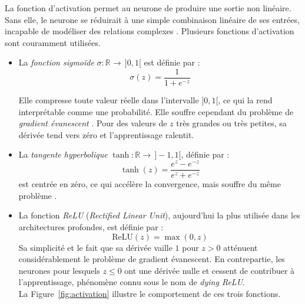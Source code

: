 \documentclass[a4paper,french]{style-LaTeX}
\begin{document}
La fonction d'activation permet au neurone de produire une sortie non linéaire. Sans elle, le neurone se réduirait à une simple combinaison linéaire de ses entrées, incapable de modéliser des relations complexes \cite{Goodfellow16}. Plusieurs fonctions d'activation sont couramment utilisées.
\begin{itemize}
\item La \emph{fonction sigmoïde} $\sigma : \mathbb{R} \to \,]0,1[$ est définie par :
\begin{equation*}
    \sigma(z) = \frac{1}{1 + e^{-z}}
\end{equation*}

Elle compresse toute valeur réelle dans l'intervalle $]0,1[$, ce qui la rend interprétable comme une probabilité. Elle souffre cependant du problème de \emph{gradient évanescent} \cite{Goodfellow16}. Pour des valeurs de $z$ très grandes ou très petites, sa dérivée tend vers zéro et l'apprentissage ralentit.
\item La \emph{tangente hyperbolique} $\tanh : \mathbb{R} \to \,]-1,1[$, définie par :
\begin{equation*}
    \tanh(z) = \frac{e^z - e^{-z}}{e^z + e^{-z}}
\end{equation*}
est centrée en zéro, ce qui accélère la convergence, mais souffre du même problème \cite{Goodfellow16}.
\item La fonction \emph{ReLU} (\emph{Rectified Linear Unit}), aujourd'hui la plus utilisée dans les architectures profondes, est définie par :
\begin{equation*}
    \mathrm{ReLU}(z) = \max(0, z)
\end{equation*}
Sa simplicité et le fait que sa dérivée vaille $1$ pour $z > 0$ atténuent considérablement le problème de gradient évanescent. En contrepartie, les neurones pour lesquels $z \leq 0$ ont une dérivée nulle et cessent de contribuer à l'apprentissage, phénomène connu sous le nom de \emph{dying ReLU}. \\
La Figure~\ref{fig:activation} illustre le comportement de ces trois fonctions.

\end{itemize}
\end{document}
